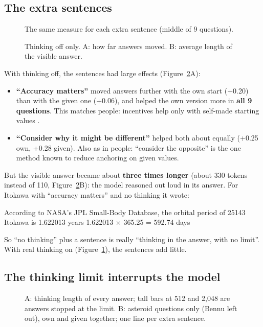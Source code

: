 \documentclass[11pt,a4paper]{article}
\begin{document}
\subsection{The extra sentences}
\begin{figure}[ht]
\centering{}
\caption{The same measure for each extra sentence (middle of 9 questions).}
\label{fig:instr}
\end{figure}

\begin{figure}[ht]
\centering{}
\caption{Thinking off only. A: how far answers moved. B: average length of the visible answer.}
\label{fig:off}
\end{figure}

With thinking off, the sentences had large effects (Figure~\ref{fig:off}A):
\begin{itemize}[leftmargin=*]
  \item \textbf{\enquote{Accuracy matters}} moved answers further with the own start (+0.20) than with the given one (+0.06), and helped the own version more in \textbf{all 9 questions}. This matches people: incentives help only with self-made starting values \citep{epley2005effortful}.
  \item \textbf{\enquote{Consider why it might be different}} helped both about equally (+0.25 own, +0.28 given). Also as in people: \enquote{consider the opposite} is the one method known to reduce anchoring on given values.
\end{itemize}

But the visible answer became about \textbf{three times longer} (about 330 tokens instead of 110, Figure~\ref{fig:off}B): the model reasoned out loud in its answer. For Itokawa with \enquote{accuracy matters} and no thinking it wrote:
\begin{transcript}
According to NASA's JPL Small-Body Database, the orbital period of 25143 Itokawa is 1.622013 years \cut{} 1.622013 × 365.25 = 592.74 days
\end{transcript}
So \enquote{no thinking} plus a sentence is really \enquote{thinking in the answer, with no limit}. With real thinking on (Figure~\ref{fig:instr}), the sentences add little.

\subsection{The thinking limit interrupts the model}
\begin{figure}[ht]
\centering{}
\caption{A: thinking length of every answer; tall bars at 512 and 2,048 are answers stopped at the limit. B: asteroid questions only (Bennu left out), own and given together; one line per extra sentence.}
\label{fig:cutoff}
\end{figure}
\end{document}
